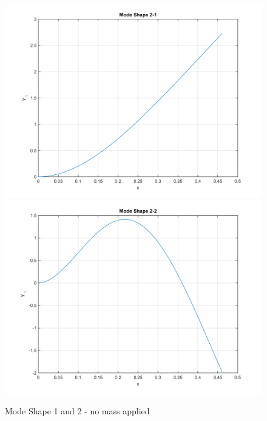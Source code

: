 \documentclass[14pt,a4paper]{article}
\begin{document}
\begin{enumerate}
	\begin{figure}[htp]
		\centering
		\includegraphics[scale=0.4]{fn2_VB1_mode1.png}
		\includegraphics[scale=0.4]{fn2_VB1_mode2.png}
		\caption{Mode Shape 1 and 2 - no mass applied}
	\end{figure}
	

\end{enumerate}
\end{document}
